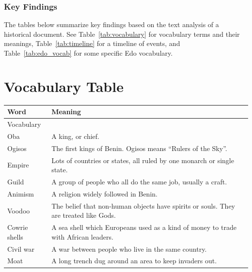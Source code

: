 \subsubsection{Key Findings}
The tables below summarize key findings based on the text analysis of a historical document. See Table~\ref{tab:vocabulary} for vocabulary terms and their meanings, Table~\ref{tab:timeline} for a timeline of events, and Table~\ref{tab:edo_vocab} for some specific Edo vocabulary.

\section*{Vocabulary Table}
\begin{tabular}{|l|p{10cm}|}
\hline
\textbf{Word} & \textbf{Meaning} \\
\hline
Vocabulary & \\
\hline
Oba & A king, or chief. \\
\hline
Ogisos & The first kings of Benin. Ogisos means “Rulers of the Sky”. \\
\hline
Empire & Lots of countries or states, all ruled by one monarch or single state. \\
\hline
Guild & A group of people who all do the same job, usually a craft. \\
\hline
Animism & A religion widely followed in Benin. \\
\hline
Voodoo & The belief that non-human objects have spirits or souls. They are treated like Gods. \\
\hline
Cowrie shells & A sea shell which Europeans used as a kind of money to trade with African leaders. \\
\hline
Civil war & A war between people who live in the same country. \\
\hline
Moat & A long trench dug around an area to keep invaders out. \\
\hline
\end{tabular}
\label{tab:vocabulary}

\vspace{1cm} 

